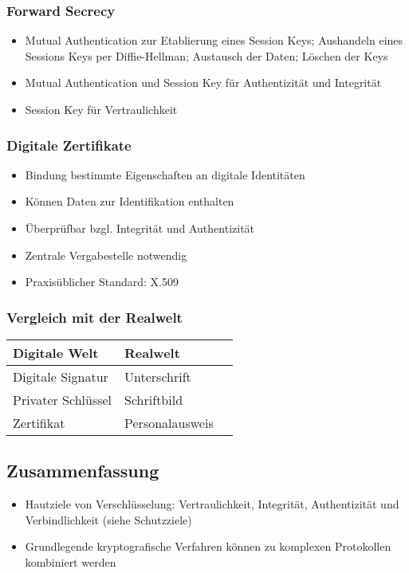 \subsubsection{Forward Secrecy}
\begin{itemize}
	\item Mutual Authentication zur Etablierung eines Session Keys; Aushandeln eines Sessions Keys per Diffie-Hellman; Austausch der Daten; Löschen der Keys
	\item Mutual Authentication und Session Key für Authentizität und Integrität
	\item Session Key für Vertraulichkeit
\end{itemize}

\subsubsection{Digitale Zertifikate}
\begin{itemize}
	\item Bindung bestimmte Eigenschaften an digitale Identitäten
	\item Können Daten zur Identifikation enthalten
	\item Überprüfbar bzgl. Integrität und Authentizität
	\item Zentrale Vergabestelle notwendig
	\item Praxisüblicher Standard: X.509
\end{itemize}

\subsubsection{Vergleich mit der Realwelt}

\begin{tabularx}{\columnwidth}{|X|X|l}
	\hline
	\textbf{Digitale Welt} & \textbf{Realwelt} \\
	\hline
	Digitale Signatur & Unterschrift \\
	Privater Schlüssel & Schriftbild \\
	Zertifikat & Personalausweis \\
	\hline
\end{tabularx}


\subsection{Zusammenfassung}
\begin{itemize}
	\item Hautziele von Verschlüsselung: Vertraulichkeit, Integrität, Authentizität und Verbindlichkeit (siehe Schutzziele)
	\item Grundlegende kryptografische Verfahren können zu komplexen Protokollen kombiniert werden
\end{itemize}



